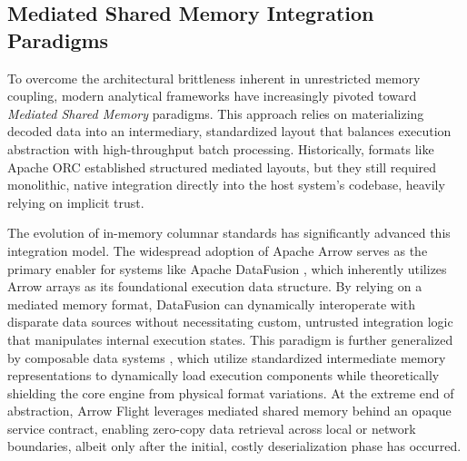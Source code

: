 \documentclass[onecolumn]{IEEEtran}
\numberwithin{equation}{section}
\theoremstyle{definition}
\theoremstyle{remark}
\begin{document}
\subsection{Mediated Shared Memory Integration Paradigms}

To overcome the architectural brittleness inherent in unrestricted memory coupling, modern analytical frameworks have increasingly pivoted toward \textit{Mediated Shared Memory} paradigms. This approach relies on materializing decoded data into an intermediary, standardized layout that balances execution abstraction with high-throughput batch processing. Historically, formats like Apache ORC \cite{apache2016orc} established structured mediated layouts, but they still required monolithic, native integration directly into the host system's codebase, heavily relying on implicit trust.

The evolution of in-memory columnar standards has significantly advanced this integration model. The widespread adoption of Apache Arrow \cite{apache2023arrow} serves as the primary enabler for systems like Apache DataFusion \cite{lamb2024apache}, which inherently utilizes Arrow arrays as its foundational execution data structure. By relying on a mediated memory format, DataFusion can dynamically interoperate with disparate data sources without necessitating custom, untrusted integration logic that manipulates internal execution states. This paradigm is further generalized by composable data systems \cite{pedreira2023composable}, which utilize standardized intermediate memory representations to dynamically load execution components while theoretically shielding the core engine from physical format variations. At the extreme end of abstraction, Arrow Flight \cite{apache2025arrowflight} leverages mediated shared memory behind an opaque service contract, enabling zero-copy data retrieval across local or network boundaries, albeit only after the initial, costly deserialization phase has occurred.
\end{document}
